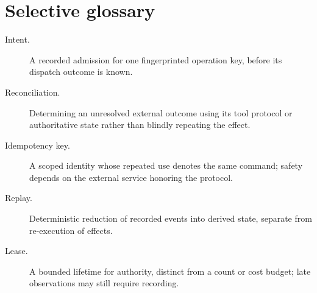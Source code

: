 \section{Selective glossary}
\begin{description}
\item[Intent.] A recorded admission for one fingerprinted operation key, before
its dispatch outcome is known.
\item[Reconciliation.] Determining an unresolved external outcome using its
tool protocol or authoritative state rather than blindly repeating the effect.
\item[Idempotency key.] A scoped identity whose repeated use denotes the same
command; safety depends on the external service honoring the protocol.
\item[Replay.] Deterministic reduction of recorded events into derived state,
separate from re-execution of effects.
\item[Lease.] A bounded lifetime for authority, distinct from a count or cost
budget; late observations may still require recording.
\end{description}

